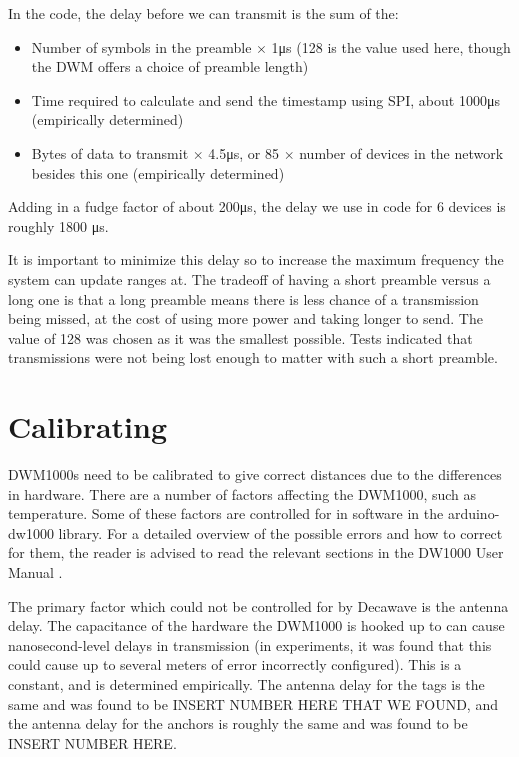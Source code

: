 In the code, the delay before we can transmit is the sum of the:
\begin{itemize}
	\item Number of symbols in the preamble $\times$ 1\si{\micro\second} (128 is the value used here, though the DWM offers a choice of preamble length)
	\item Time required to calculate and send the timestamp using SPI, about 1000\si{\micro\second} (empirically determined)
	\item Bytes of data to transmit $\times$ 4.5\si{\micro\second}, or 85 $\times$ number of devices in the network besides this one (empirically determined)
\end{itemize}

Adding in a fudge factor of about 200\si{\micro\second}, the delay we use in code for 6 devices is roughly 1800 \si{\micro\second}.

It is important to minimize this delay so to increase the maximum frequency the system can update ranges at. The tradeoff of having a short preamble versus a long one is that a long preamble means there is less chance of a transmission being missed, at the cost of using more power and taking longer to send. The value of 128 was chosen as it was the smallest possible. Tests indicated that transmissions were not being lost enough to matter with such a short preamble.

\section{Calibrating}
DWM1000s need to be calibrated to give correct distances due to the differences in hardware. There are a number of factors affecting the DWM1000, such as temperature. Some of these factors are controlled for in software in the arduino-dw1000 library. For a detailed overview of the possible errors and how to correct for them, the reader is advised to read the relevant sections in the DW1000 User Manual \cite{DW1000UserManual}.

The primary factor which could not be controlled for by Decawave is the antenna delay. The capacitance of the hardware the DWM1000 is hooked up to can cause nanosecond-level delays in transmission (in experiments, it was found that this could cause up to several meters of error incorrectly configured). This is a constant, and is determined empirically. The antenna delay for the tags is the same and was found to be INSERT NUMBER HERE THAT WE FOUND, and the antenna delay for the anchors is roughly the same and was found to be INSERT NUMBER HERE.

